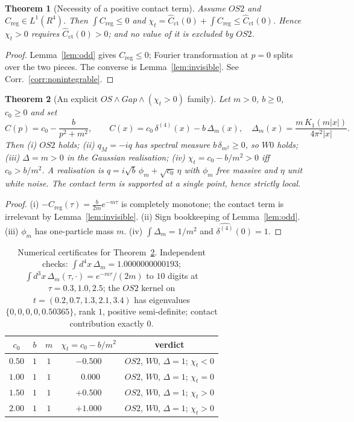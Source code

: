 \documentclass[11pt,a4paper]{article}
\def\R{R}\def\N{N}\def\Q{Q}\def\Z{Z}\def\Class{C}\def\OS{OS}\def\Gap{Gap}%
\theoremstyle{plain}
\newtheorem{theorem}{Theorem}[section]
\theoremstyle{definition}
\theoremstyle{remark}
\newcommand{\R}{\mathbb{R}}\newcommand{\N}{\mathbb{N}}\newcommand{\Q}{\mathbb{Q}}
\newcommand{\Z}{\mathbb{Z}}\newcommand{\Spec}{\operatorname{Spec}}
\newcommand{\OS}{\mathrm{OS}}\newcommand{\Gap}{\mathrm{Gap}}
\newcommand{\Class}{\mathcal{C}}\newcommand{\Htot}{\mathcal{H}}
\newcommand{\Chit}{\chi_t}
\renewcommand{\_}{\oldunderscore\allowbreak}
\begin{document}
\begin{theorem}[Necessity of a positive contact term]\label{thm:contact}
Assume $\OS2$ and $C_{\mathrm{reg}}\in L^1(\R^4)$. Then $\int C_{\mathrm{reg}}\le0$ and
$\Chit=\widehat C_{\mathrm{ct}}(0)+\int C_{\mathrm{reg}}\le\widehat C_{\mathrm{ct}}(0)$.
Hence $\Chit>0$ requires $\widehat C_{\mathrm{ct}}(0)>0$; and no value of it is excluded by $\OS2$.
\end{theorem}
\begin{proof}
Lemma~\ref{lem:odd} gives $C_{\mathrm{reg}}\le0$; Fourier transformation at $p=0$ splits over the
two pieces. The converse is Lemma~\ref{lem:invisible}. See Corr.~\ref{corr:nonintegrable}.
\end{proof}
\begin{theorem}[An explicit $\OS\wedge\Gap\wedge(\Chit>0)$ family]\label{thm:family}
Let $m>0$, $b\ge0$, $c_0\ge0$ and set
\[
\widehat C(p)=c_0-\frac{b}{p^2+m^2},
\qquad
C(x)=c_0\,\delta^{(4)}(x)-b\,\Delta_m(x),
\quad
\Delta_m(x)=\frac{m\,K_1(m|x|)}{4\pi^2|x|}.
\]
Then (i) $\OS2$ holds; (ii) $q_M=-iq$ has spectral measure $b\,\delta_{m^2}\ge0$, so $W0$ holds;
(iii) $\Delta=m>0$ in the Gaussian realisation; (iv) $\Chit=c_0-b/m^2>0$ iff $c_0>b/m^2$.
A realisation is $q=i\sqrt b\,\phi_m+\sqrt{c_0}\,\eta$ with $\phi_m$ free massive and $\eta$ unit
white noise. The contact term is supported at a single point, hence strictly local.
\end{theorem}
\begin{proof}
(i) $-C_{\mathrm{reg}}(\tau)=\frac{b}{2m}e^{-m\tau}$ is completely monotone; the contact term is
irrelevant by Lemma~\ref{lem:invisible}. (ii) Sign bookkeeping of Lemma~\ref{lem:odd}.
(iii) $\phi_m$ has one-particle mass $m$. (iv) $\int\Delta_m=1/m^2$ and
$\widehat{\delta^{(4)}}(0)=1$.
\end{proof}
\begin{table}[htbp]\centering\small
\renewcommand{\arraystretch}{1.2}
\begin{tabular}{ccccc}
\toprule
$c_0$ & $b$ & $m$ & $\Chit=c_0-b/m^2$ & verdict\\
\midrule
$0.50$ & $1$ & $1$ & $-0.500$ & $\OS2$, $W0$, $\Delta=1$; $\Chit<0$\\
$1.00$ & $1$ & $1$ & $\ \ 0.000$ & $\OS2$, $W0$, $\Delta=1$; $\Chit=0$\\
$1.50$ & $1$ & $1$ & $+0.500$ & $\OS2$, $W0$, $\Delta=1$; \emph{$\Chit>0$}\\
$2.00$ & $1$ & $1$ & $+1.000$ & $\OS2$, $W0$, $\Delta=1$; \emph{$\Chit>0$}\\
\bottomrule
\end{tabular}
\caption{Numerical certificates for Theorem~\ref{thm:family}. Independent checks:
$\int d^4x\,\Delta_m=1.0000000000193$; $\int d^3x\,\Delta_m(\tau,\cdot)=e^{-m\tau}/(2m)$ to $10$
digits at $\tau=0.3,1.0,2.5$; the $\OS2$ kernel on $t=(0.2,0.7,1.3,2.1,3.4)$ has eigenvalues
$\{0,0,0,0,0.50365\}$, rank $1$, positive semi-definite; contact contribution exactly $0$.}
\label{tab:contact}
\end{table}
\end{document}
